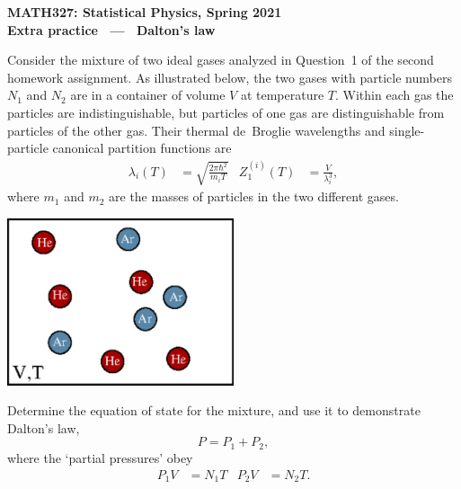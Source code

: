 \documentclass[12 pt]{article} %
\newcommand{\la}{\ensuremath{\lambda} }
\begin{document}
\newcommand{\thisweek}{MATH327 Extra (Dalton)}
\newcommand{\moddate}{Last modified 21 May 2021}
\begin{center}
  {\Large \textbf{MATH327: Statistical Physics, Spring 2021}} \\[12 pt]
  {\Large \textbf{Extra practice \ --- \ Dalton's law}} \\[24 pt]
\end{center}

Consider the mixture of two ideal gases analyzed in Question~1 of the second homework assignment.
As illustrated below, the two gases with particle numbers $N_1$ and $N_2$ are in a container of volume $V$ at temperature $T$.
Within each gas the particles are indistinguishable, but particles of one gas are distinguishable from particles of the other gas.
Their thermal de~Broglie wavelengths and single-particle canonical partition functions are
\begin{align*}
  \la_i(T) & = \sqrt{\frac{2\pi\hbar^2}{m_i T}} &
  Z_1^{(i)}(T) & = \frac{V}{\la_i^3},
\end{align*}
where $m_1$ and $m_2$ are the masses of particles in the two different gases.

\begin{center}\includegraphics[width=0.5\textwidth]{figs/mixed.pdf}\end{center}

Determine the equation of state for the mixture, and use it to demonstrate Dalton's law,
\begin{equation*}
  P = P_1 + P_2,
\end{equation*}
where the `partial pressures' obey
\begin{align*}
  P_1 V & = N_1 T &
  P_2 V & = N_2 T.
\end{align*}
\end{document}
